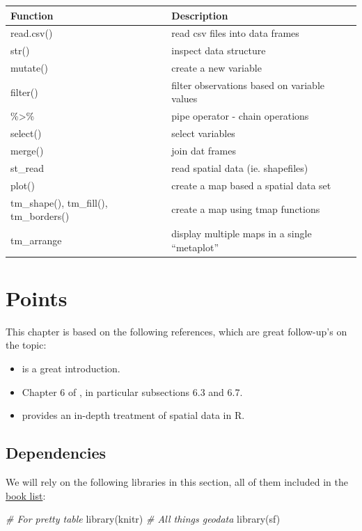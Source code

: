 \documentclass[
]{book}
\newenvironment{Shaded}{\begin{snugshade}}{\end{snugshade}}
\newcommand{\CommentTok}[1]{\textcolor[rgb]{0.56,0.35,0.01}{\textit{#1}}}
\newcommand{\FunctionTok}[1]{\textcolor[rgb]{0.00,0.00,0.00}{#1}}
\newcommand{\NormalTok}[1]{#1}
\providecommand{\tightlist}{%
  \setlength{\itemsep}{0pt}\setlength{\parskip}{0pt}}
\begin{document}
\begin{longtable}[]{@{}ll@{}}
\toprule
Function & Description\tabularnewline
\midrule
\endhead
read.csv() & read csv files into data frames\tabularnewline
str() & inspect data structure\tabularnewline
mutate() & create a new variable\tabularnewline
filter() & filter observations based on variable values\tabularnewline
\%\textgreater\% & pipe operator - chain operations\tabularnewline
select() & select variables\tabularnewline
merge() & join dat frames\tabularnewline
st\_read & read spatial data (ie. shapefiles)\tabularnewline
plot() & create a map based a spatial data set\tabularnewline
tm\_shape(), tm\_fill(), tm\_borders() & create a map using tmap functions\tabularnewline
tm\_arrange & display multiple maps in a single ``metaplot''\tabularnewline
\bottomrule
\end{longtable}

\hypertarget{points}{%
\chapter{Points}\label{points}}

This chapter is based on the following references, which are great follow-up's on the topic:

\begin{itemize}
\tightlist
\item
  \citet{lovelace2014introduction} is a great introduction.
\item
  Chapter 6 of \citet{comber2015}, in particular subsections 6.3 and 6.7.
\item
  \citet{bivand2013applied} provides an in-depth treatment of spatial data in R.
\end{itemize}

\hypertarget{dependencies-1}{%
\section{Dependencies}\label{dependencies-1}}

We will rely on the following libraries in this section, all of them included in the \protect\hyperlink{Dependency-list}{book list}:

\begin{Shaded}
\begin{Highlighting}[]
\CommentTok{\# For pretty table}
\FunctionTok{library}\NormalTok{(knitr)}
\CommentTok{\# All things geodata}
\FunctionTok{library}\NormalTok{(sf)}
\end{Highlighting}
\end{Shaded}
\end{document}
